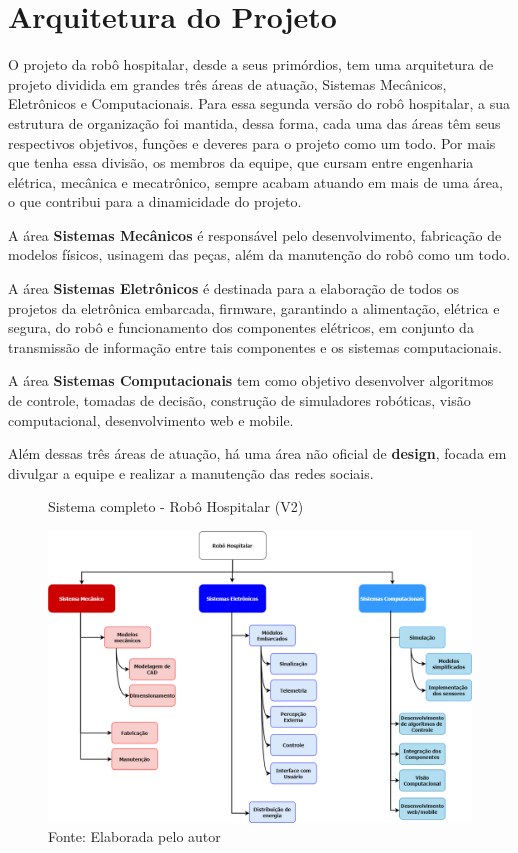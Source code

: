 \documentclass[../delivery_hospital_report.tex]{subfiles}
\begin{document}
\chapter{Arquitetura do Projeto}

O projeto da  robô hospitalar, desde a seus primórdios, tem uma arquitetura de projeto dividida em grandes três áreas de atuação, Sistemas Mecânicos, Eletrônicos e Computacionais. Para essa segunda versão do robô hospitalar, a sua estrutura de organização foi mantida, dessa forma, cada uma das áreas têm seus respectivos objetivos, funções e deveres para o projeto como um todo. Por mais que tenha essa divisão, os membros da equipe, que cursam entre engenharia elétrica, mecânica e mecatrônico, sempre acabam atuando em mais de uma área, o que contribui para a dinamicidade do projeto.

A área \textbf{Sistemas Mecânicos} é responsável pelo desenvolvimento, fabricação de modelos físicos, usinagem das peças, além da manutenção do robô como um todo. 

A área \textbf{Sistemas Eletrônicos} é destinada para a elaboração de todos os projetos da eletrônica embarcada, firmware, garantindo a alimentação, elétrica e segura, do robô e funcionamento dos componentes elétricos, em conjunto da transmissão de informação entre tais componentes e os sistemas computacionais.

A área \textbf{Sistemas Computacionais} tem como objetivo desenvolver algoritmos de controle, tomadas de decisão, construção de simuladores robóticas, visão computacional, desenvolvimento web e mobile.

Além dessas três áreas de atuação, há uma área não oficial de \textbf{design}, focada em divulgar a equipe e realizar a manutenção das redes sociais. \cite{site_robo_hospitalar21}

\begin{figure}[h]
\centering
    \caption{Sistema completo - Robô Hospitalar (V2)}
    \centering %
    \includegraphics[width=17cm]{sistema_robo.png}
    \caption*{Fonte: Elaborada pelo autor}
    \label{figura:1° Versão Robô Hospitalar}
\end{figure}
\end{document}

